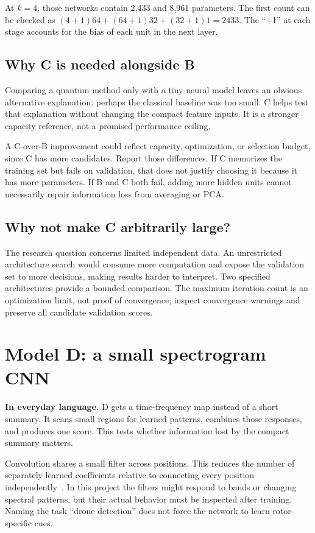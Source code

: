 \documentclass[11pt,letterpaper]{article}
\newcommand{\plain}[1]{\par\smallskip\noindent\textbf{In everyday language.} #1\par\smallskip}
\begin{document}
At $k=4$, those networks contain 2,433 and 8,961 parameters. The first count
can be checked as $(4+1)64+(64+1)32+(32+1)1=2433$. The ``+1'' at each
stage accounts for the bias of each unit in the next layer.

\subsection{Why C is needed alongside B}
Comparing a quantum method only with a tiny neural model leaves an obvious
alternative explanation: perhaps the classical baseline was too small.
C helps test that explanation without changing the compact feature inputs.
It is a stronger capacity reference, not a promised performance ceiling.

A C-over-B improvement could reflect capacity, optimization, or selection
budget, since C has more candidates. Report those differences. If C memorizes
the training set but fails on validation, that does not justify choosing it
because it has more parameters. If B and C both fail, adding more hidden units
cannot necessarily repair information loss from averaging or PCA.

\subsection{Why not make C arbitrarily large?}
The research question concerns limited independent data. An unrestricted
architecture search would consume more computation and expose the validation
set to more decisions, making results harder to interpret. Two specified
architectures provide a bounded comparison. The maximum iteration count is
an optimization limit, not proof of convergence; inspect convergence warnings
and preserve all candidate validation scores.

\section{Model D: a small spectrogram CNN}
\label{sec:modeld}
\plain{D gets a time-frequency map instead of a short summary. It scans small
regions for learned patterns, combines those responses, and produces one
score. This tests whether information lost by the compact summary matters.}

Convolution shares a small filter across positions. This reduces the number
of separately learned coefficients relative to connecting every position
independently~\cite{convbook}. In this project the filters might respond to
bands or changing spectral patterns, but their actual behavior must be
inspected after training. Naming the task ``drone detection'' does not force
the network to learn rotor-specific cues.
\end{document}
